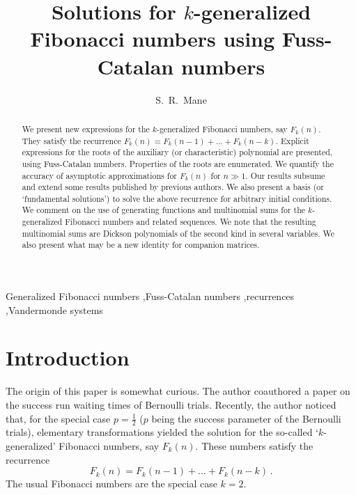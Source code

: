 \documentclass[review]{elsarticle}
\theoremstyle{plain}
\begin{document}

\begin{frontmatter}

\title{Solutions for $k$-generalized Fibonacci numbers using Fuss-Catalan numbers}

\author[cc]{S.~R.~Mane}
\address[cc]{Convergent Computing Inc., P.~O.~Box 561, Shoreham, NY 11786, USA}

\begin{abstract}
  We present new expressions for the $k$-generalized Fibonacci numbers, say $F_k(n)$.
  They satisfy the recurrence $F_k(n) = F_k(n-1) +\dots+F_k(n-k)$.
  Explicit expressions for the roots of the auxiliary (or characteristic) polynomial are presented, using Fuss-Catalan numbers.
  Properties of the roots are enumerated.
  We quantify the accuracy of asymptotic approximations for $F_k(n)$ for $n\gg1$.
  Our results subsume and extend some results published by previous authors.
  We also present a basis (or `fundamental solutions') to solve the above recurrence for arbitrary initial conditions.  
  We comment on the use of generating functions and multinomial sums for the $k$-generalized Fibonacci numbers and related sequences.
  We note that the resulting multinomial sums are Dickson polynomials of the second kind in several variables.
  We also present what may be a new identity for companion matrices.
\end{abstract}

\begin{keyword}
  Generalized Fibonacci numbers
  \sep Fuss-Catalan numbers
  \sep recurrences
  \sep Vandermonde systems


\end{keyword}

\end{frontmatter}

\setcounter{equation}{0}
\section{Introduction}\label{sec:intro}
The origin of this paper is somewhat curious.
The author coauthored a paper \cite{DM3} on the success run waiting times of Bernoulli trials.
Recently, the author noticed that, for the special case $p=\frac12$ ($p$ being the success parameter of the Bernoulli trials),
elementary transformations yielded the solution for the so-called `$k$-generalized' Fibonacci numbers, say $F_k(n)$.
These numbers satisfy the recurrence
\begin{equation}
\label{eq:rec_Fnk}
F_k(n) = F_k(n-1) +\dots +F_k(n-k) \,.
\end{equation}
The usual Fibonacci numbers are the special case $k=2$.
\end{document}
